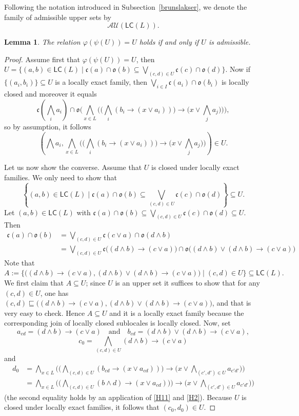 \documentclass[11pt,a4paper,reqno]{amsart}
\newcommand{\tbigwedge}{\mathop{\textstyle \bigwedge }}%
\newcommand{\tbigvee}{\mathop{\textstyle \bigvee }}%
\newcommand{\cat}[1]{\ensuremath{\mathsf{#1}}} %
\def\cl{\mathfrak{c}}
\def\op{\mathfrak{o}}
\newtheorem{lemma}[theorem]{Lemma}
\theoremstyle{definition}
\theoremstyle{remark}
\newcommand{\ca}[1]{\mathcal{#1}}
\newcommand{\mf}{\mathsf}
\begin{document}
{Following the notation introduced in Subsection~\ref{brunslakser}, we denote the family of admissible upper sets by $$\ca{AU}(\mf{LC}(L)).$$


\begin{lemma}\label{l: fixpoints phipsi}
The relation $\varphi(\psi(U))=U$ holds if and only if $U$ is admissible.
\end{lemma}

\begin{proof}
Assume first that  $\varphi(\psi(U))=U$, then $U=\{ (a,b)\in \mathsf{LC}(L)\mid \cl(a)\cap\op(b)\subseteq \tbigvee_{(c,d)\in U}\cl(c)\cap\op(d)\}$. Now if $\{(a_i,b_i)\}\subseteq U$ is a locally exact family, then $\tbigvee_{i\in I}\cl(a_i)\cap\op(b_i)$ is locally closed and moreover it equals 
$$\cl(\tbigwedge_i a_i)\cap \op\biggl(   \tbigwedge_{x\in L} \biggl(  \big(\tbigwedge _i (b_i\to (x\vee a_i)) \big) \to \big( x\vee  \tbigwedge_j a_j\bigr) \biggr) \biggr),$$
so by assumption, it follows $$\left(\tbigwedge a_i,   \tbigwedge_{x\in L} \biggl(  \big(\tbigwedge _i (b_i\to (x\vee a_i)) \big) \to \big( x\vee  \tbigwedge_j a_j\bigr) \biggr)\right)\in U.$$

Let us now show the converse. Assume that $U$ is closed under locally exact families. We only need to show that $$\left\{ (a,b)\in \mathsf{LC}(L)\mid \cl(a)\cap\op(b)\subseteq \tbigvee_{(c,d)\in U}\cl(c)\cap\op(d)\right\}\subseteq U.$$
Let $(a,b)\in \mathsf{LC}(L)$ with $ \cl(a)\cap\op(b)\subseteq \tbigvee_{(c,d)\in U}\cl(c)\cap\op(d)\subseteq U$. 
Then
\begin{align*}\cl(a)\cap \op(b)&= \tbigvee_{(c,d)\in U}\cl(c\vee a)\cap\op(d\wedge b) \\ &=\tbigvee_{(c,d)\in U}\cl\bigl((d\wedge b)\to (c\vee a)\bigr)\cap\op\bigl((d\wedge b)\vee (d\wedge b)\to(c\vee a)\bigr)
\end{align*}
Note that $A:=\biggl\{ \bigl((d\wedge b)\to (c\vee a), (d\wedge b)\vee (d\wedge b)\to (c\vee a)\bigr) \mid (c,d)\in U\biggr\}\subseteq \cat{LC}(L).$
We first claim that $ A\subseteq U$; since $U$ is an upper set it suffices to show that for any $(c,d)\in U$, one has $(c,d)\sqsubseteq  \bigl((d\wedge b)\to (c\vee a), (d\wedge b)\vee (d\wedge b)\to (c\vee a)\bigr)$, and that is very easy to check.
Hence $A\subseteq U$ and it is a locally exact family because the corresponding join of locally closed sublocales is locally closed. Now, set
$$a_{cd}=(d\wedge b)\to (c\vee a)\quad\text{and}\quad b_{cd}= (d\wedge b)\vee (d\wedge b)\to (c\vee a),$$
$$c_0=  \tbigwedge_{(c,d)\in U} (d\wedge b)\to (c\vee a)$$
and
\begin{align*}d_0&=  \tbigwedge_{x\in L} \biggl(  \big(\tbigwedge _{(c,d)\in U}(b_{cd}\to (x\vee a_{cd})) \big) \to \big( x\vee  \tbigwedge_{(c',d')\in U} a_{c'd'}\bigr)\biggr)\\&=
  \tbigwedge_{x\in L} \biggl(  \big(\tbigwedge _{(c,d)\in U}(b\wedge d)\to (x\vee a_{cd})) \big) \to \big( x\vee  \tbigwedge_{(c',d')\in U} a_{c'd'}\bigr)\biggr)
\end{align*}
(the second equality holds by an application of \ref{H11} and \ref{H2}).  Because $U$ is closed under locally exact families, it follows that $(c_0,d_0)\in U$.


\end{proof}}
\end{document}
